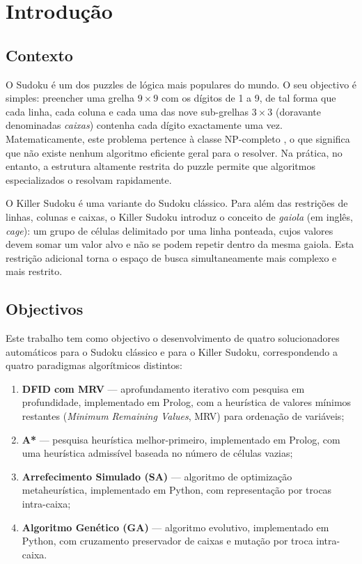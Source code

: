 %
%
\chapter{Introdução}
\label{cha:introducao}

\section{Contexto}
\label{sec:contexto}

O Sudoku é um dos puzzles de lógica mais populares do mundo. O seu objectivo é simples: preencher uma grelha $9 \times 9$ com os dígitos de 1 a 9, de tal forma que cada linha, cada coluna e cada uma das nove sub-grelhas $3 \times 3$ (doravante denominadas \emph{caixas}) contenha cada dígito exactamente uma vez. Matematicamente, este problema pertence à classe NP-completo \cite{yato2003complexity}, o que significa que não existe nenhum algoritmo eficiente geral para o resolver. Na prática, no entanto, a estrutura altamente restrita do puzzle permite que algoritmos especializados o resolvam rapidamente.

O Killer Sudoku é uma variante do Sudoku clássico. Para além das restrições de linhas, colunas e caixas, o Killer Sudoku introduz o conceito de \emph{gaiola} (em inglês, \emph{cage}): um grupo de células delimitado por uma linha ponteada, cujos valores devem somar um valor alvo e não se podem repetir dentro da mesma gaiola. Esta restrição adicional torna o espaço de busca simultaneamente mais complexo e mais restrito.

\section{Objectivos}
\label{sec:objectivos}

Este trabalho tem como objectivo o desenvolvimento de quatro solucionadores automáticos para o Sudoku clássico e para o Killer Sudoku, correspondendo a quatro paradigmas algorítmicos distintos:

\begin{enumerate}
    \item \textbf{DFID com MRV} — aprofundamento iterativo com pesquisa em profundidade, implementado em Prolog, com a heurística de valores mínimos restantes (\emph{Minimum Remaining Values}, MRV) para ordenação de variáveis;
    \item \textbf{A*} — pesquisa heurística melhor-primeiro, implementado em Prolog, com uma heurística admissível baseada no número de células vazias;
    \item \textbf{Arrefecimento Simulado (SA)} — algoritmo de optimização metaheurística, implementado em Python, com representação por trocas intra-caixa;
    \item \textbf{Algoritmo Genético (GA)} — algoritmo evolutivo, implementado em Python, com cruzamento preservador de caixas e mutação por troca intra-caixa.
\end{enumerate}

